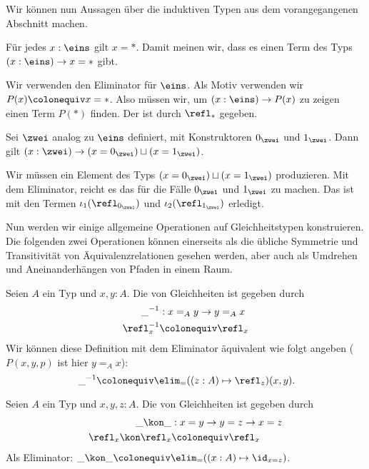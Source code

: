 Wir können nun Aussagen über die induktiven Typen aus dem vorangegangenen Abschnitt machen.
\begin{bemerkung}
  Für jedes $x:\eins$ gilt $x=\ast$.
  Damit meinen wir, dass es einen Term des Typs $(x:\eins)\to x=\ast$ gibt.
\end{bemerkung}
\begin{beweis}
  Wir verwenden den Eliminator für $\eins$.
  Als Motiv verwenden wir $P(x)\colonequiv x=\ast$. Also müssen wir, um $(x:\eins)\to P(x)$ zu zeigen einen Term $P(\ast)$ finden. Der ist durch $\refl_\ast$ gegeben. 
\end{beweis}

\begin{bemerkung}
  Sei $\zwei$ analog zu $\eins$ definiert, mit Konstruktoren $0_\zwei$ und $1_\zwei$.
  Dann gilt $(x:\zwei)\to (x=0_\zwei)\sqcup (x=1_\zwei)$.
\end{bemerkung}
\begin{beweis}
  Wir müssen ein Element des Typs $(x=0_\zwei)\sqcup (x=1_\zwei)$ produzieren.
  Mit dem Eliminator, reicht es das für die Fälle $0_\zwei$ und $1_\zwei$ zu machen.
  Das ist mit den Termen $\iota_1(\refl_{0_\zwei})$ und $\iota_2(\refl_{1_\zwei})$ erledigt.
\end{beweis}

Nun werden wir einige allgemeine Operationen auf Gleichheitstypen konstruieren.
Die folgenden zwei Operationen können einerseits als die übliche Symmetrie und Transitivität von Äquivalenzrelationen gesehen werden, aber auch als Umdrehen und Aneinanderhängen von Pfaden in einem Raum.

\begin{definition}
  Seien $A$ ein Typ und $x,y:A$.
  Die  von Gleichheiten ist gegeben durch
  \begin{align*}
    \_^{-1} &: x=_Ay\to y=_Ax \\
    \refl_x^{-1}&\colonequiv \refl_x 
  \end{align*}
  Wir können diese Definition mit dem Eliminator äquivalent wie folgt angeben ($P(x,y, p)$ ist hier $y=_Ax$):
  \[
     \_^{-1}\colonequiv \elim_=((z:A) \mapsto \refl_z)(x,y)\rlap{.}
  \]
\end{definition}

\begin{definition}
  Seien $A$ ein Typ und $x,y,z:A$.
  Die \index{$\_\kon\_$} von Gleichheiten ist gegeben durch
  \begin{align*}
    \_\kon\_&:x=y\to y=z\to x=z \\
    \refl_x\kon \refl_x &\colonequiv  \refl_x
  \end{align*}
  Als Eliminator: $\_\kon\_\colonequiv \elim_=((x:A)\mapsto \id_{x=z})$.
\end{definition}

